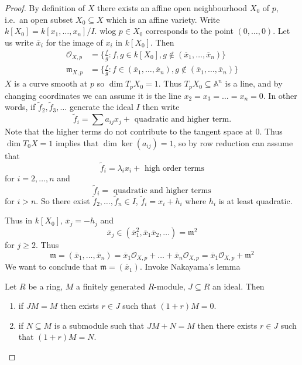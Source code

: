 \documentclass[a4paper]{article}
\renewcommand{\A}{\mathbb{A}}
\begin{document}
\begin{proof}
  By definition of \(X\) there exists an affine open neighbourhood \(X_0\) of \(p\), i.e.\ an open subset \(X_0 \subseteq X\) which is an affine variety. Write \(k[X_0] = k[x_1, \dots, x_n]/I\). wlog \(p \in X_0\) corresponds to the point \((0, \dots, 0)\). Let us write \(\overline x_i\) for the image of \(x_i\) in \(k[X_0]\). Then
  \begin{align*}
    \mathcal O_{X, p} &= \{\frac{f}{g}: f, g \in k[X_0], g \notin (\overline x_1, \dots, \overline x_n)\} \\
    \mathfrak m_{X, p} &= \{\frac{f}{g}: f \in (\overline x_1, \dots, \overline x_n), g \notin (\overline x_1, \dots, \overline x_n)\}
  \end{align*}
  \(X\) is a curve smooth at \(p\) so \(\dim T_pX_0 = 1\). Thus \(T_pX_0 \subseteq \A^n\) is a line, and by changing coordinates we can assume it is the line \(x_2 = x_3 = \dots = x_n = 0\). In other words, if \(\tilde f_2, \tilde f_3, \dots\) generate the ideal \(I\) then write
  \[
    \tilde f_i = \sum a_{ij} x_j + \text{ quadratic and higher term}.
  \]
  Note that the higher terms do not contribute to the tangent space at \(0\). Thus \(\dim T_0 X = 1\) implies that \(\dim \ker (a_{ij}) = 1\), so by row reduction can assume that
  \[
    \tilde f_i = \lambda_i x_i + \text{ high order terms}
  \]
  for \(i = 2, \dots, n\) and
  \[
    \tilde f_i =  \text{ quadratic and higher terms}
  \]
  for \(i > n\). So there exist \(\tilde f_2, \dots, \tilde f_n \in I\), \(\tilde f_i = x_i + h_i\) where \(h_i\) is at least quadratic.

  Thus in \(k[X_0]\), \(\overline x_j = -h_j\) and
  \[
    \overline x_j \in (\overline x_1^2, \overline x_1 \overline x_2, \dots) = \mathfrak m^2
  \]
  for \(j \geq 2\). Thus
  \[
    \mathfrak m
    = (\overline x_1, \dots, \overline x_n)
    = \overline x_1 \mathcal O_{X, p} + \dots + \overline x_n \mathcal O_{X, p}
    = \overline x_1 \mathcal O_{X, p} + \mathfrak m^2
  \]
  We want to conclude that \(\mathfrak m = (\overline x_1)\). Invoke Nakayama's lemma

  \begin{proposition}
    Let \(R\) be a ring, \(M\) a finitely generated \(R\)-module, \(J \subseteq R\) an ideal. Then
    \begin{enumerate}
    \item if \(JM = M\) then exists \(r \in J\) such that \((1 + r) M = 0\).
    \item if \(N \subseteq M\) is a submodule such that \(JM + N = M\) then there exists \(r \in J\) such that \((1 + r) M = N\).
    \end{enumerate}
  \end{proposition}


\end{proof}
\end{document}

